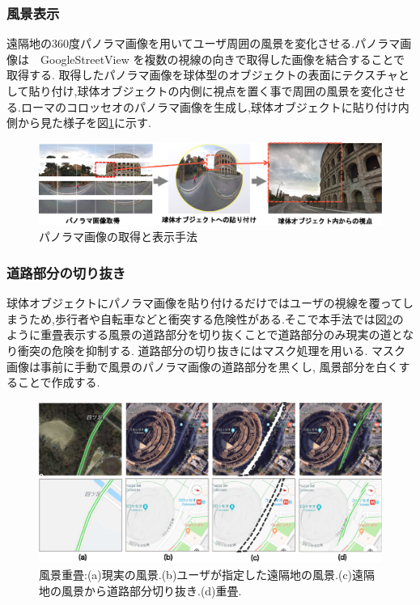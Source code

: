 \clearpage


\subsubsection{風景表示}
遠隔地の360度パノラマ画像を用いてユーザ周囲の風景を変化させる.パノラマ画像は　GoogleStreetView\cite{gsv} を複数の視線の向きで取得した画像を結合することで取得する.
取得したパノラマ画像を球体型のオブジェクトの表面にテクスチャとして貼り付け,球体オブジェクトの内側に視点を置く事で周囲の風景を変化させる.ローマのコロッセオのパノラマ画像を生成し,球体オブジェクトに貼り付け内側から見た様子を図\ref{figure:sphere}に示す.

\begin{figure}[htbp]
\begin{center}
\includegraphics[width=16cm]{img/02_proposedmethod/scenery_change.eps} 
\end{center}
\caption{パノラマ画像の取得と表示手法}
\label{figure:sphere}
\end{figure} 

\clearpage

\subsubsection{道路部分の切り抜き}
球体オブジェクトにパノラマ画像を貼り付けるだけではユーザの視線を覆ってしまうため,歩行者や自転車などと衝突する危険性がある.そこで本手法では図\ref{figure:trimroad}のように重畳表示する風景の道路部分を切り抜くことで道路部分のみ現実の道となり衝突の危険を抑制する.
道路部分の切り抜きにはマスク処理を用いる.
マスク画像は事前に手動で風景のパノラマ画像の道路部分を黒くし, 風景部分を白くすることで作成する.

\begin{figure}[htbp]
\begin{center}
\includegraphics[width=16cm]{img/02_proposedmethod/overlay.eps}
\end{center}
\caption{風景重畳:(a)現実の風景.(b)ユーザが指定した遠隔地の風景.(c)遠隔地の風景から道路部分切り抜き.(d)重畳.}
\label{figure:trimroad}
\end{figure} 

